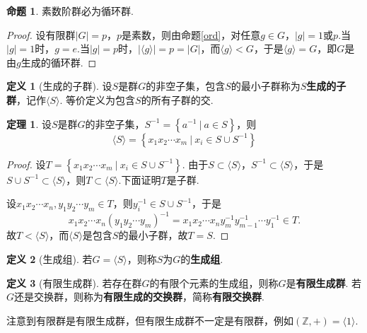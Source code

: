 \documentclass[12pt]{ctexart}
\theoremstyle{definition}
\newtheorem{definition}{定义}
\newtheorem{theorem}{定理}
\newtheorem{proposition}{命题}
\theoremstyle{plain}
\begin{document}
	\begin{proposition}
		素数阶群必为循环群.
	\end{proposition}
	\begin{proof}
		设有限群$|G|=p$，$p$是素数，则由命题\ref{ord}，对任意$g\in G$，$|g|=1$或$p$.当$|g|=1$时，$g=e$.当$|g|=p$时，$|\langle g\rangle|=p=|G|$，而$\langle g\rangle<G$，于是$\langle g\rangle=G$，即$G$是由$g$生成的循环群.
	\end{proof}
	\begin{definition}[生成的子群]
		设$S$是群$G$的非空子集，包含$S$的最小子群称为$S$\textbf{生成的子群}，记作$\langle S\rangle$. 等价定义为包含$S$的所有子群的交.
	\end{definition}
	\begin{theorem}
		设$S$是群$G$的非空子集，$S^{-1}=\left\{a^{-1}\ |\ a\in S\right\}$，则
		$$\langle S\rangle=\left\{x_1x_2\cdots x_m\ |\ x_i\in S\cup S^{-1}\right\}$$
	\end{theorem}
	\begin{proof}
		设$T=\left\{x_1x_2\cdots x_m\ |\ x_i\in S\cup S^{-1}\right\}$. 由于$S\subset\langle S\rangle$，$S^{-1}\subset\langle S\rangle$，于是$S\cup S^{-1}\subset\langle S\rangle$，则$T\subset\langle S\rangle$.下面证明$T$是子群.
		
		设$x_1x_2\cdots x_n,y_1y_2\cdots y_m\in T$，则$y_i^{-1}\in S\cup S^{-1}$，于是
		$$x_1x_2\cdots x_n(y_1y_2\cdots y_m)^{-1}=x_1x_2\cdots x_ny_m^{-1}y_{m-1}^{-1}\cdots y_1^{-1}\in T.$$
		故$T<\langle S\rangle$，而$\langle S\rangle$是包含$S$的最小子群，故$T=S$.
	\end{proof}
	\begin{definition}[生成组]
		若$G=\langle S\rangle$，则称$S$为$G$的\textbf{生成组}.
	\end{definition}
	\begin{definition}[有限生成群]
		若存在群$G$的有限个元素的生成组，则称$G$是\textbf{有限生成群}. 若$G$还是交换群，则称为\textbf{有限生成的交换群}，简称\textbf{有限交换群}.
	\end{definition}
	注意到有限群是有限生成群，但有限生成群不一定是有限群，例如$(\mathbb{Z},+)=\langle 1\rangle$.
\end{document}
